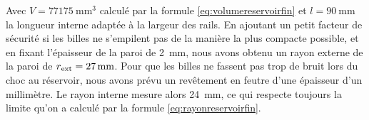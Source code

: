 Avec $V= \SI{77175}{\mm\cubed}$ calculé par la formule \ref{eq:volumereservoirfin} et $l=\SI{90}{\mm}$ la longueur interne adaptée à la largeur des rails. En ajoutant un petit facteur de sécurité si les billes ne s'empilent pas de la manière la plus compacte possible, et en fixant l'épaisseur de la paroi de \SI{2}{\mm}, nous avons obtenu un rayon externe de la paroi de $r\textsubscript{ext}=\SI{27}{\mm}$. Pour que les billes ne fassent pas trop de bruit lors du choc au réservoir, nous avons prévu un revêtement en feutre d'une épaisseur d'un millimètre. Le rayon interne mesure alors \SI{24}{\mm}, ce qui respecte toujours la limite qu'on a calculé par la formule \ref{eq:rayonreservoirfin}.